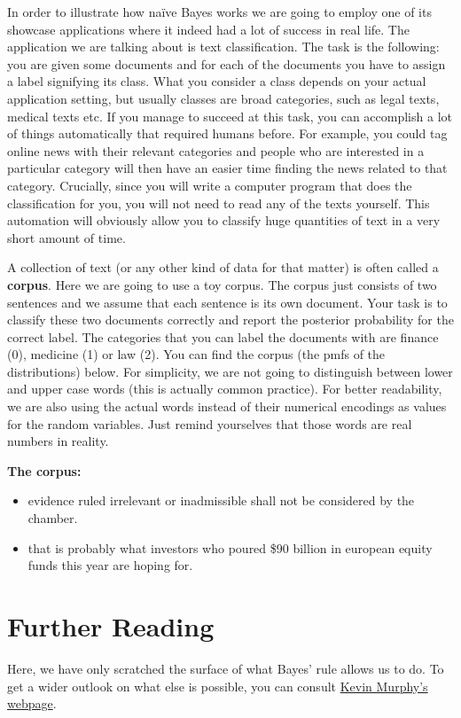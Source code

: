 In order to illustrate how na\"ive Bayes works we are going to employ one of its showcase applications where it indeed had
a lot of success in real life. The application we are talking about is text classification. The task is the following: you
are given some documents and for each of the documents you have to assign a label signifying its class. What you consider
a class depends on your actual application setting, but usually classes are broad categories, such as legal texts, medical
texts etc. If you manage to succeed at this task, you can accomplish a lot of things automatically that required humans before. For example, you could tag online news with their relevant categories and people who are interested in
a particular category will then have an easier time finding the news related to that category. Crucially, since you will
write a computer program that does the classification for you, you will not need to read any of the texts yourself. This automation will obviously allow you to classify huge quantities of text in a very short amount of time.

\begin{Exercise}
A collection of text (or any other kind of data for that matter) is often called a \textbf{corpus}. Here we are going to
use a toy corpus. The corpus just consists of two sentences and we assume that each sentence is its own document.
Your task is to classify these two documents correctly and report the posterior probability for the correct label. 
The categories that you can label the documents with are
finance (0), medicine (1) or law (2). You can find the corpus (the pmfs of the distributions) below. For simplicity, we are not going to distinguish between lower and upper case words (this is actually common practice). For better 
readability, we are also using the actual words instead of their numerical encodings as values for the random 
variables. Just remind yourselves that those words are real numbers in reality.
\end{Exercise}

\textbf{The corpus:}
\begin{itemize}
\item evidence ruled irrelevant or inadmissible shall not be considered by the chamber.
\item that is probably what investors who poured \$90 billion in european equity funds this year are hoping for.
\end{itemize}

\section*{Further Reading}
Here, we have only scratched the surface of what Bayes' rule allows us to do. To get a wider outlook on what else is possible,
you can consult \href{http://www.cs.ubc.ca/~murphyk/Bayes/bayesrule.html}{Kevin Murphy's webpage}.

